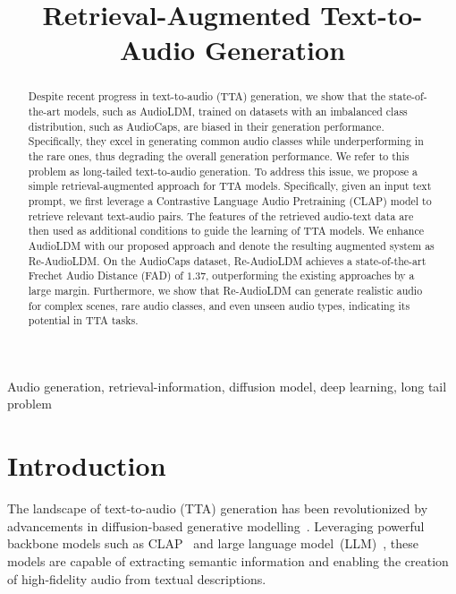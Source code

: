 \documentclass{article}
\title{Retrieval-Augmented Text-to-Audio Generation}
\begin{document}
\maketitle

\begin{abstract}
Despite recent progress in text-to-audio (TTA) generation, we show that the state-of-the-art models, such as AudioLDM, trained on datasets with an imbalanced class distribution, such as AudioCaps, are biased in their generation performance. Specifically, they excel in generating common audio classes while underperforming in the rare ones, thus degrading the overall generation performance. We refer to this problem as long-tailed text-to-audio generation. To address this issue, we propose a simple retrieval-augmented approach for TTA models. Specifically, given an input text prompt, we first leverage a Contrastive Language Audio Pretraining (CLAP) model to retrieve relevant text-audio pairs. The features of the retrieved audio-text data are then used as additional conditions to guide the learning of TTA models. We enhance AudioLDM with our proposed approach and denote the resulting augmented system as Re-AudioLDM. On the AudioCaps dataset, Re-AudioLDM achieves a state-of-the-art Frechet Audio Distance (FAD) of $1.37$, outperforming the existing approaches by a large margin. Furthermore, we show that Re-AudioLDM can generate realistic audio for complex scenes, rare audio classes, and even unseen audio types, indicating its potential in TTA tasks.
\end{abstract}


\begin{keywords}
	Audio generation, retrieval-information, diffusion model, deep learning, long tail problem
\end{keywords}



\section{Introduction}
\label{sec:intro}
The landscape of text-to-audio (TTA) generation has been revolutionized by advancements in diffusion-based generative modelling~\cite{audioldm,makeaudio,wavjourney}. Leveraging powerful backbone models such as CLAP~\cite{audioldm} and large language model~(LLM)~\cite{tango}, these models are capable of extracting semantic information and enabling the creation of high-fidelity audio from textual descriptions. 
\end{document}
